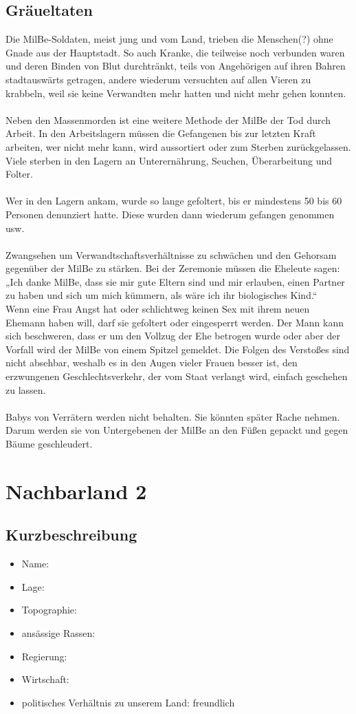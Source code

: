 \subsection{Gräueltaten}
Die MilBe-Soldaten, meist jung und vom Land, trieben die Menschen(?) ohne Gnade aus der Hauptstadt.
So auch Kranke, die teilweise noch verbunden waren und deren Binden von Blut durchtränkt, teils von Angehörigen auf ihren Bahren stadtauswärts getragen, andere wiederum versuchten auf allen Vieren zu krabbeln, weil sie keine Verwandten mehr hatten und nicht mehr gehen konnten.\\
\\
Neben den Massenmorden ist eine weitere Methode der MilBe der Tod durch Arbeit.
In den Arbeitslagern müssen die Gefangenen bis zur letzten Kraft arbeiten, wer nicht mehr kann, wird aussortiert oder zum Sterben zurückgelassen.
Viele sterben in den Lagern an Unterernährung, Seuchen, Überarbeitung und Folter.\\
\\
Wer in den Lagern ankam, wurde so lange gefoltert, bis er mindestens 50 bis 60 Personen denunziert hatte.
Diese wurden dann wiederum gefangen genommen usw.\\
\\
Zwangsehen um Verwandtschaftsverhältnisse zu schwächen und den Gehorsam gegenüber der MilBe zu stärken.
Bei der Zeremonie müssen die Eheleute sagen: „Ich danke MilBe, dass sie mir gute Eltern sind und mir erlauben, einen Partner zu haben und sich um mich kümmern, als wäre ich ihr biologisches Kind.“\\
Wenn eine Frau Angst hat oder schlichtweg keinen Sex mit ihrem neuen Ehemann haben will, darf sie gefoltert oder eingesperrt werden.
Der Mann kann sich beschweren, dass er um den Vollzug der Ehe betrogen wurde oder aber der Vorfall wird der MilBe von einem Spitzel gemeldet.
Die Folgen des Verstoßes sind nicht absehbar, weshalb es in den Augen vieler Frauen besser ist, den erzwungenen Geschlechtsverkehr, der vom Staat verlangt wird, einfach geschehen zu lassen.\\
\\
Babys von Verrätern werden nicht behalten.
Sie könnten später Rache nehmen.
Darum werden sie von Untergebenen der MilBe an den Füßen gepackt und gegen Bäume geschleudert.

\section{Nachbarland 2}
\subsection{Kurzbeschreibung}
\begin{itemize}
	\item Name: 
	\item Lage:
	\item Topographie:
	\item ansässige Rassen:
	\item Regierung:
	\item Wirtschaft:
	\item politisches Verhältnis zu unserem Land: freundlich
\end{itemize}

